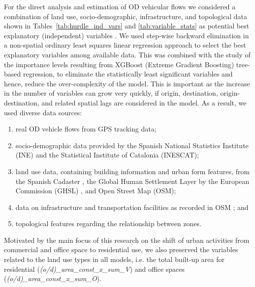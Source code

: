 For the direct analysis and estimation of OD vehicular flows
we considered a combination of land use, socio-demographic, infrastructure, and topological data shown in Tables~\ref{tab:hurdle_ind_vars} and \ref{tab:variable_stats} as potential best explanatory (independent) variables \citep{Krueger2023ACorrections}.
We used step-wise backward elimination in a non-spatial ordinary least squares linear regression approach to select the best explanatory variables among available data. This was combined with the study of the importance levels resulting from XGBoost (Extreme Gradient Boosting) tree-based regression, to eliminate the statistically least significant variables and hence, reduce the over-complexity of the model. 
This is important as the increase in the number of variables can grow very quickly, if origin, destination, origin-destination, and related spatial lags are considered in the model.
As a result, we used diverse data sources: 
\begin{enumerate}
    \item real OD vehicle flows from GPS tracking data; 
    \item socio-demographic data provided by the Spanish National Statistics Institute (INE) and the Statistical Institute of Catalonia (INESCAT); 
    \item land use data, containing building information and urban form features, from the Spanish Cadaster \citep{ MinisteriodeHacienda.GobiernodeEspana2024SedeInicio}, the Global Human Settlement Layer by the European Commission (GHSL) \citep{Pesaresi2023GHS-BUILT-CData}, and Open Street Map (OSM); 
    \item data on infrastructure and transportation facilities as recorded in OSM \citep{OpenStreetMap}; and
    \item topological features regarding the relationship between zones.
 \end{enumerate}
Motivated by the main focus of this research on the shift of urban activities from commercial and office space to residential use, we also preserved the variables related to the land use types in all models, i.e. the total built-up area for residential (\emph{(o/d)\_area\_const\_x\_sum\_V}) and office spaces (\emph{(o/d)\_area\_const\_x\_sum\_O}).




